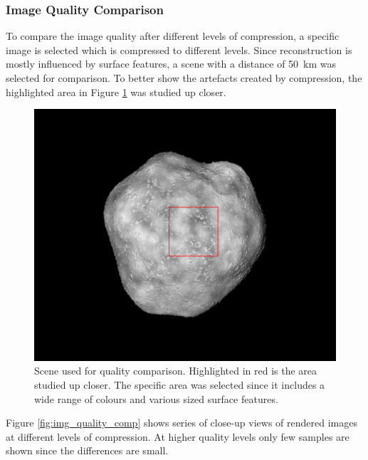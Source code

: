 \subsubsection{Image Quality Comparison}
To compare the image quality after different levels of compression, a specific image is selected which is compressed to different levels. Since reconstruction is mostly influenced by surface features, a scene with a distance of \SI{50}{\kilo\meter} was selected for comparison. To better show the artefacts created by compression, the highlighted area in Figure \ref{fig:img_quality_frame} was studied up closer.

\begin{figure}[htb]
    \centering
    \includegraphics[width=.7\textwidth]{doc/thesis/0_figures/quality_compare/jp2_1000_frame.png}
    \caption{Scene used for quality comparison. Highlighted in red is the area studied up closer. The specific area was selected since it includes a wide range of colours and various sized surface features.}
    \label{fig:img_quality_frame}
\end{figure}

Figure \ref{fig:img_quality_comp} shows series of close-up views of rendered images at different levels of compression. At higher quality levels only few samples are shown since the differences are small.

